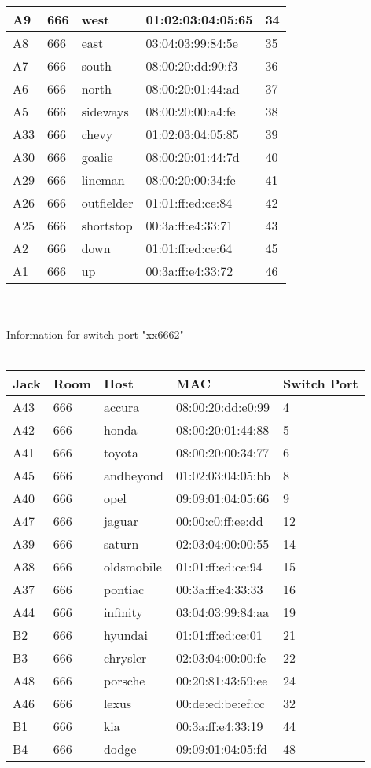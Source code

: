 \documentclass{article}
\begin{document}
\begin{tabular}{| l | l | l | l | l |}
\hline
A9 & 666 & west & 01:02:03:04:05:65 & 34 \\
\hline
A8 & 666 & east & 03:04:03:99:84:5e & 35 \\
\hline
A7 & 666 & south & 08:00:20:dd:90:f3 & 36 \\
\hline
A6 & 666 & north & 08:00:20:01:44:ad & 37 \\
\hline
A5 & 666 & sideways & 08:00:20:00:a4:fe & 38 \\
\hline
A33 & 666 & chevy & 01:02:03:04:05:85 & 39 \\
\hline
A30 & 666 & goalie & 08:00:20:01:44:7d & 40 \\
\hline
A29 & 666 & lineman & 08:00:20:00:34:fe & 41 \\
\hline
A26 & 666 & outfielder & 01:01:ff:ed:ce:84 & 42 \\
\hline
A25 & 666 & shortstop & 00:3a:ff:e4:33:71 & 43 \\
\hline
A2 & 666 & down & 01:01:ff:ed:ce:64 & 45 \\
\hline
A1 & 666 & up & 00:3a:ff:e4:33:72 & 46 \\
\hline
\end{tabular}
\\
\\
Information for switch port "xx6662"
\\
\\
\begin{tabular}{| l | l | l | l | l |}
\hline
Jack & Room & Host & MAC & Switch Port \\
\hline
A43 & 666 & accura & 08:00:20:dd:e0:99 & 4 \\
\hline
A42 & 666 & honda & 08:00:20:01:44:88 & 5 \\
\hline
A41 & 666 & toyota & 08:00:20:00:34:77 & 6 \\
\hline
A45 & 666 & andbeyond & 01:02:03:04:05:bb & 8 \\
\hline
A40 & 666 & opel & 09:09:01:04:05:66 & 9 \\
\hline
A47 & 666 & jaguar & 00:00:c0:ff:ee:dd & 12 \\
\hline
A39 & 666 & saturn & 02:03:04:00:00:55 & 14 \\
\hline
A38 & 666 & oldsmobile & 01:01:ff:ed:ce:94 & 15 \\
\hline
A37 & 666 & pontiac & 00:3a:ff:e4:33:33 & 16 \\
\hline
A44 & 666 & infinity & 03:04:03:99:84:aa & 19 \\
\hline
B2 & 666 & hyundai & 01:01:ff:ed:ce:01 & 21 \\
\hline
B3 & 666 & chrysler & 02:03:04:00:00:fe & 22 \\
\hline
A48 & 666 & porsche & 00:20:81:43:59:ee & 24 \\
\hline
A46 & 666 & lexus & 00:de:ed:be:ef:cc & 32 \\
\hline
B1 & 666 & kia & 00:3a:ff:e4:33:19 & 44 \\
\hline
B4 & 666 & dodge & 09:09:01:04:05:fd & 48 \\
\hline
\end{tabular}
\\
\\
\end{document}
